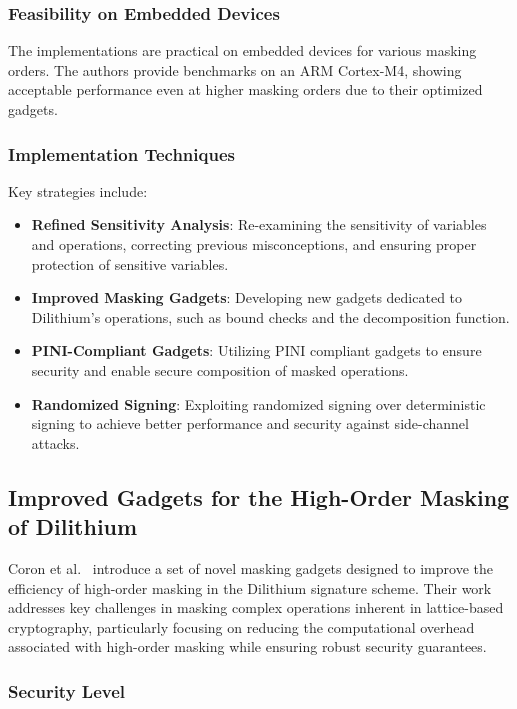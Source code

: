 \subsubsection{Feasibility on Embedded Devices}

The implementations are practical on embedded devices for various masking orders. The authors provide benchmarks on an ARM Cortex-M4, showing acceptable performance even at higher masking orders due to their optimized gadgets.

\subsubsection{Implementation Techniques}

Key strategies include:

\begin{itemize}
    \item \textbf{Refined Sensitivity Analysis}: Re-examining the sensitivity of variables and operations, correcting previous misconceptions, and ensuring proper protection of sensitive variables.
    \item \textbf{Improved Masking Gadgets}: Developing new gadgets dedicated to Dilithium's operations, such as bound checks and the decomposition function.
    \item \textbf{PINI-Compliant Gadgets}: Utilizing \ac{PINI} compliant gadgets to ensure security and enable secure composition of masked operations.
    \item \textbf{Randomized Signing}: Exploiting randomized signing over deterministic signing to achieve better performance and security against side-channel attacks.
\end{itemize}

\subsection{Improved Gadgets for the High-Order Masking of Dilithium}

Coron et al.\ \cite{Coron23} introduce a set of novel masking gadgets designed to improve the efficiency of high-order masking in the Dilithium signature scheme. Their work addresses key challenges in masking complex operations inherent in lattice-based cryptography, particularly focusing on reducing the computational overhead associated with high-order masking while ensuring robust security guarantees.

\subsubsection{Security Level}

